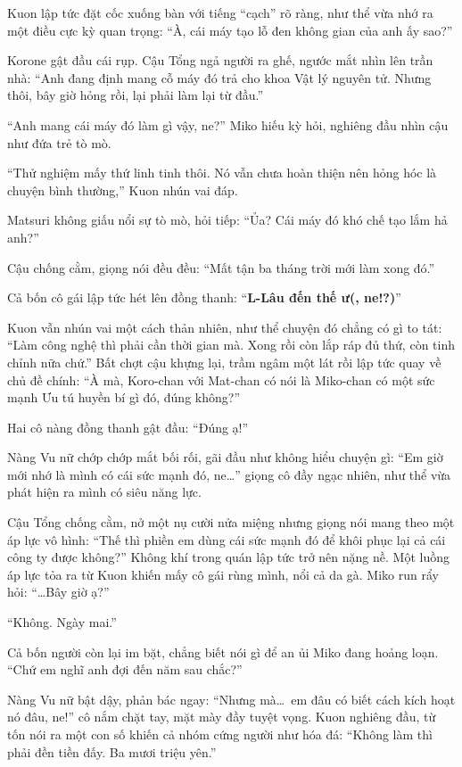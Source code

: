 \documentclass[../main.tex]{subfiles}
\begin{document}
Kuon lập tức đặt cốc xuống bàn với tiếng ``cạch'' rõ ràng, như thể vừa nhớ ra một điều cực kỳ quan trọng: ``À, cái máy tạo lỗ đen không gian của anh ấy sao?''

Korone gật đầu cái rụp. Cậu Tổng ngả người ra ghế, ngước mắt nhìn lên trần nhà: ``Anh đang định mang cỗ máy đó trả cho khoa Vật lý nguyên tử. Nhưng thôi, bây giờ hỏng rồi, lại phải làm lại từ đầu.''

``Anh mang cái máy đó làm gì vậy, ne?'' Miko hiếu kỳ hỏi, nghiêng đầu nhìn cậu như đứa trẻ tò mò.

``Thử nghiệm mấy thứ linh tinh thôi. Nó vẫn chưa hoàn thiện nên hỏng hóc là chuyện bình thường,'' Kuon nhún vai đáp.

Matsuri không giấu nổi sự tò mò, hỏi tiếp: ``Ủa? Cái máy đó khó chế tạo lắm hả anh?''

Cậu chống cằm, giọng nói đều đều: ``Mất tận ba tháng trời mới làm xong đó.''

Cả bốn cô gái lập tức hét lên đồng thanh: ``\textbf{L-Lâu đến thế ư(, ne!?)}''

Kuon vẫn nhún vai một cách thản nhiên, như thể chuyện đó chẳng có gì to tát: ``Làm công nghệ thì phải cần thời gian mà. Xong rồi còn lắp ráp đủ thứ, còn tinh chỉnh nữa chứ.'' Bất chợt cậu khựng lại, trầm ngâm một lát rồi lập tức quay về chủ đề chính: ``À mà, Koro-chan với Mat-chan có nói là Miko-chan có một sức mạnh Ưu tú huyền bí gì đó, đúng không?''

Hai cô nàng đồng thanh gật đầu: ``Đúng ạ!''

Nàng Vu nữ chớp chớp mắt bối rối, gãi đầu như không hiểu chuyện gì: ``Em giờ mới nhớ là mình có cái sức mạnh đó, ne\dots'' giọng cô đầy ngạc nhiên, như thể vừa phát hiện ra mình có siêu năng lực.

Cậu Tổng chống cằm, nở một nụ cười nửa miệng nhưng giọng nói mang theo một áp lực vô hình: ``Thế thì phiền em dùng cái sức mạnh đó để khôi phục lại cả cái công ty được không?'' Không khí trong quán lập tức trở nên nặng nề. Một luồng áp lực tỏa ra từ Kuon khiến mấy cô gái rùng mình, nổi cả da gà. Miko run rẩy hỏi: ``\dots Bây giờ ạ?''

``Không. Ngày mai.''

Cả bốn người còn lại im bặt, chẳng biết nói gì để an ủi Miko đang hoảng loạn.  ``Chứ em nghĩ anh đợi đến năm sau chắc?''

Nàng Vu nữ bật dậy, phản bác ngay: ``Nhưng mà\dots\ em đâu có biết cách kích hoạt nó đâu, ne!'' cô nắm chặt tay, mặt mày đầy tuyệt vọng. Kuon nghiêng đầu, từ tốn nói ra một con số khiến cả nhóm cứng người như hóa đá: ``Không làm thì phải đền tiền đấy. Ba mươi triệu yên.''
\end{document}
